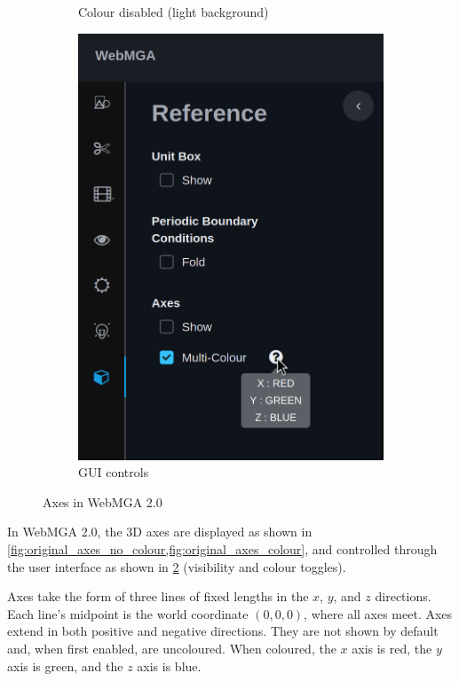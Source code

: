 \begin{figure}
\begin{center}
\begin{subfigure}{0.4\textwidth}
      \caption{Colour disabled (light background)}
      \label{fig:original_axes_no_colour_bad}
    \end{subfigure}
    \begin{subfigure}{0.4\textwidth}
      \includegraphics[width=\linewidth]{assets/images/axes/2_gui}
      \caption{GUI controls}
      \label{fig:original_axes_controls}
    \end{subfigure} 
  \end{center}
  \caption{Axes in WebMGA 2.0}
  \label{fig:original_axes}
\end{figure}

In WebMGA 2.0, the 3D axes are displayed as shown in \cref{fig:original_axes_no_colour,fig:original_axes_colour}, and controlled through the user interface as shown in \cref{fig:original_axes_controls} (visibility and colour toggles).

Axes take the form of three lines of fixed lengths in the $x$, $y$, and $z$ directions. Each line's midpoint is the world coordinate $(0, 0, 0)$, where all axes meet. Axes extend in both positive and negative directions. They are not shown by default and, when first enabled, are uncoloured. When coloured, the $x$ axis is red, the $y$ axis is green, and the $z$ axis is blue.

